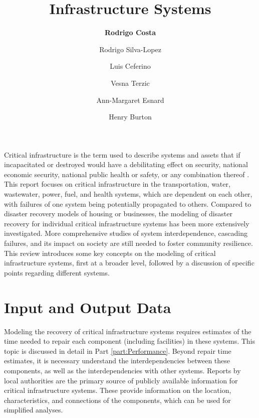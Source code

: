 \title{Infrastructure Systems}
\author{
    \textbf{Rodrigo Costa}
    \and Rodrigo Silva-Lopez 
    \and Luis Ceferino 
    \and{Vesna Terzic}
    \and{Ann-Margaret Esnard}
    \and{Henry Burton}}
\tocauthor{}
%
%
\maketitle
Critical infrastructure is the term used to describe systems and assets that if incapacitated or destroyed would have a debilitating effect on security, national economic security, national public health or safety, or any combination thereof \citep{DHS_CI}. This report focuses on critical infrastructure in the transportation, water, wastewater, power, fuel, and health systems, which are dependent on each other, with failures of one system being potentially propagated to others. Compared to disaster recovery models of housing or businesses, the modeling of disaster recovery for individual critical infrastructure systems has been more extensively investigated.  More comprehensive studies of system interdependence, cascading failures, and its impact on society are still needed to foster community resilience. This review introduces some key concepts on the modeling of critical infrastructure systems, first at a broader level, followed by a discussion of specific points regarding different systems.\ 

\FloatBarrier
\section{Input and Output Data}
Modeling the recovery of critical infrastructure systems requires estimates of the time needed to repair each component (including facilities) in these systems. This topic is discussed in detail in Part \ref{part:Performance}. Beyond repair time estimates, it is necessary understand the interdependencies between these components, as well as the interdependencies with other systems. Reports by local authorities are the primary source of publicly available information for critical infrastructure systems. These provide information on the location, characteristics, and connections of the components, which can be used for simplified analyses.

